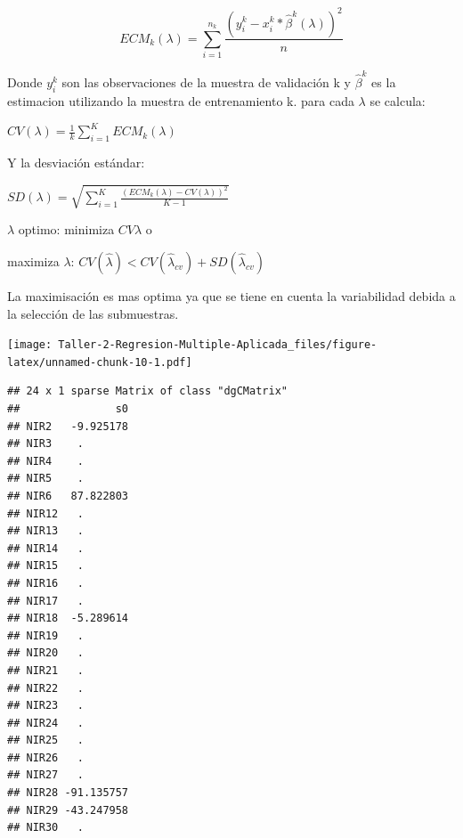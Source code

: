 \documentclass[
]{article}
\newenvironment{Shaded}{\begin{snugshade}}{\end{snugshade}}
\newcommand{\AttributeTok}[1]{\textcolor[rgb]{0.77,0.63,0.00}{#1}}
\newcommand{\DecValTok}[1]{\textcolor[rgb]{0.00,0.00,0.81}{#1}}
\newcommand{\FloatTok}[1]{\textcolor[rgb]{0.00,0.00,0.81}{#1}}
\newcommand{\FunctionTok}[1]{\textcolor[rgb]{0.00,0.00,0.00}{#1}}
\newcommand{\NormalTok}[1]{#1}
\newcommand{\OtherTok}[1]{\textcolor[rgb]{0.56,0.35,0.01}{#1}}
\newcommand{\SpecialCharTok}[1]{\textcolor[rgb]{0.00,0.00,0.00}{#1}}
\begin{document}
\[ECM_k(\lambda)= \sum_{i=1}^{n_k}\frac{(y_i^k- x_i^k*\hat{\beta}^k(\lambda))^2}{n}\]

Donde \(y_i^k\) son las observaciones de la muestra de validación k y
\(\hat{\beta}^k\) es la estimacion utilizando la muestra de
entrenamiento k. para cada \(\lambda\) se calcula:

\(CV(\lambda)=\frac{1}{k}\sum_{i=1}^{K}ECM_k(\lambda)\)

Y la desviación estándar:

\(SD(\lambda)=\sqrt{\sum_{i=1}^{K}\frac{(ECM_k(\lambda)-CV(\lambda))^2}{K-1}}\)

\(\lambda\) optimo: minimiza \(CV{\lambda}\) o

maximiza \(\lambda\):
\(CV(\hat{\lambda}) < CV(\hat{\lambda}_{cv})+SD(\hat{\lambda}_{cv})\)

La maximisación es mas optima ya que se tiene en cuenta la variabilidad
debida a la selección de las submuestras.

\begin{Shaded}
\end{Shaded}

\texttt{[image: Taller-2-Regresion-Multiple-Aplicada\_files/figure-latex/unnamed-chunk-10-1.pdf]}

\begin{Shaded}
\end{Shaded}

\begin{verbatim}
## 24 x 1 sparse Matrix of class "dgCMatrix"
##               s0
## NIR2   -9.925178
## NIR3    .       
## NIR4    .       
## NIR5    .       
## NIR6   87.822803
## NIR12   .       
## NIR13   .       
## NIR14   .       
## NIR15   .       
## NIR16   .       
## NIR17   .       
## NIR18  -5.289614
## NIR19   .       
## NIR20   .       
## NIR21   .       
## NIR22   .       
## NIR23   .       
## NIR24   .       
## NIR25   .       
## NIR26   .       
## NIR27   .       
## NIR28 -91.135757
## NIR29 -43.247958
## NIR30   .
\end{verbatim}
\end{document}
